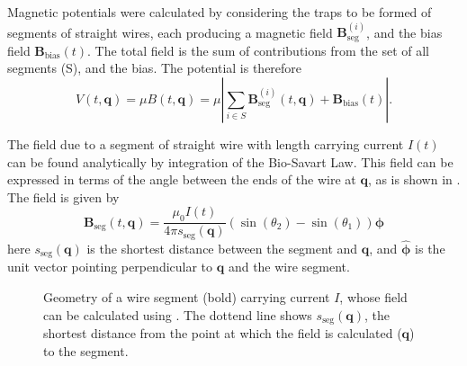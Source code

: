 Magnetic potentials were calculated by considering the traps to be formed of
segments of straight wires, each producing a magnetic field
$\mathbf{B}_\text{seg}^{(i)}$, and the bias field $\mathbf{B}_\text{bias}(t)$. The total
field is the sum of contributions from the set of all segments (S), and the
bias. The potential is therefore
%
\begin{equation} V(t, \mathbf{q}) = \mu B (t, \mathbf{q}) = \mu \left|
  \sum_{i\in S}
  \mathbf{B}_\text{seg}^{(i)}(t, \mathbf{q}) + \mathbf{B}_\text{bias}(t)\right|.
\end{equation}

The field due to a segment of straight wire with length carrying current $I(t)$
can be found analytically by integration of the Bio-Savart Law.
This field can be expressed in terms of the angle between the ends of the wire
at $\mathbf{q}$, as is shown in . The field
is given by~\cite{Griffiths2017}
%
\begin{equation}
  \mathbf{B}_\text{seg}(t, \mathbf{q}) = \frac{\mu_0 I(t)}{4\pi
  s_\text{seg}(\mathbf{q})} (\sin(\theta_2)  -
  \sin(\theta_1))\mathbf{\mathbf{\phi}}
\label{design:eq:segmentfield}
\end{equation}
here $s_\text{seg}(\mathbf{q})$ is the shortest distance between the segment
and $\mathbf{q}$, and $\hat{\mathbf{\phi}}$ is the unit vector pointing
perpendicular to $\mathbf{q}$ and the wire segment. 

\begin{figure}[h]
\centering
  \caption{Geometry of a wire segment (bold) carrying current $I$, whose field
  can be calculated using . The dottend line
  shows $s_\text{seg}(\mathbf{q})$, the shortest distance from the point at
  which the field is calculated ($\mathbf{q}$) to the segment.
  }
  \label{design:fig:wiresegment}
\end{figure}

